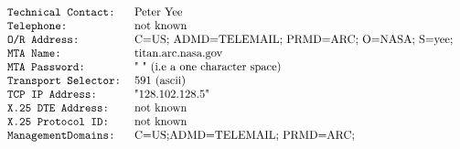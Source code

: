 \[\begin {tabular}{l l}
\tt Technical Contact:&		Peter Yee\\
\tt Telephone:&			not known\\
\tt O/R Address:&		C=US; ADMD=TELEMAIL; PRMD=ARC; O=NASA; S=yee;\\
\tt MTA Name:&			titan.arc.nasa.gov\\
\tt MTA Password:&		" " (i.e a one character space)\\ 
\tt Transport Selector:&	591 (ascii)\\ 
\tt TCP IP Address:&		"128.102.128.5"\\
\tt X.25 DTE Address:&		not known\\
\tt X.25 Protocol ID:&		not known\\
\tt ManagementDomains:&		C=US;ADMD=TELEMAIL; PRMD=ARC;\\
\end{tabular}\]
